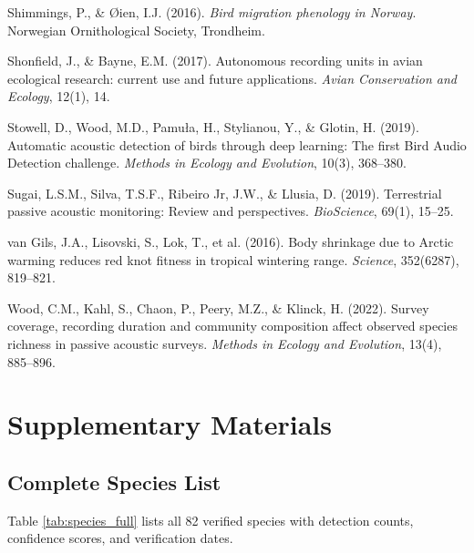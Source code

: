 \documentclass[twocolumn]{article}
\begin{document}
\begin{thebibliography}{99}
 Shimmings, P., \& Øien, I.J. (2016). \textit{Bird migration phenology in Norway}. Norwegian Ornithological Society, Trondheim.

 Shonfield, J., \& Bayne, E.M. (2017). Autonomous recording units in avian ecological research: current use and future applications. \textit{Avian Conservation and Ecology}, 12(1), 14.

 Stowell, D., Wood, M.D., Pamuła, H., Stylianou, Y., \& Glotin, H. (2019). Automatic acoustic detection of birds through deep learning: The first Bird Audio Detection challenge. \textit{Methods in Ecology and Evolution}, 10(3), 368--380.

 Sugai, L.S.M., Silva, T.S.F., Ribeiro Jr, J.W., \& Llusia, D. (2019). Terrestrial passive acoustic monitoring: Review and perspectives. \textit{BioScience}, 69(1), 15--25.

 van Gils, J.A., Lisovski, S., Lok, T., et al. (2016). Body shrinkage due to Arctic warming reduces red knot fitness in tropical wintering range. \textit{Science}, 352(6287), 819--821.

 Wood, C.M., Kahl, S., Chaon, P., Peery, M.Z., \& Klinck, H. (2022). Survey coverage, recording duration and community composition affect observed species richness in passive acoustic surveys. \textit{Methods in Ecology and Evolution}, 13(4), 885--896.

\end{thebibliography}

\newpage
\onecolumn

\appendix
\section{Supplementary Materials}

\subsection{Complete Species List}

Table \ref{tab:species_full} lists all 82 verified species with detection counts, confidence scores, and verification dates.
\end{document}
